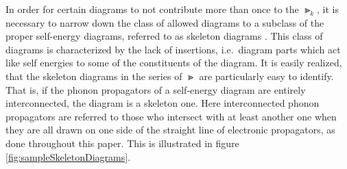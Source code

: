 In order for certain diagrams to not contribute more than once to the $ \Gt_k $, it is necessary to narrow down the class of allowed diagrams to a subclass of the proper self-energy diagrams, referred to as skeleton diagrams \cite{mattuck2012guide}. This class of diagrams is characterized by the lack of insertions, i.e.\ diagram parts which act like self energies to some of the constituents of the diagram. It is easily realized, that the skeleton diagrams in the series of $ \Gt $ are particularly easy to identify. That is, if the phonon propagators of a self-energy diagram are entirely interconnected, the diagram is a skeleton one. Here interconnected phonon propagators are referred to those who intersect with at least another one when they are all drawn on one side of the straight line of electronic propagators, as done throughout this paper. This is illustrated in figure \ref{fig:sampleSkeletonDiagrams}.
